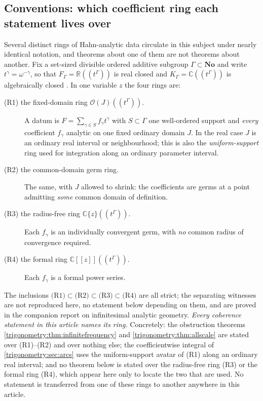 \documentclass[11pt,letterpaper]{article}
\numberwithin{equation}{section}
\theoremstyle{definition}
\theoremstyle{remark}
\newcommand{\No}{\mathbf{No}}
\newcommand{\R}{\mathbb R}
\newcommand{\C}{\mathbb C}
\begin{document}
\subsection{Conventions: which coefficient ring each statement lives over}
\label{trigonometry:sec:rings}
Several distinct rings of Hahn-analytic data circulate in this subject under nearly identical
notation, and theorems about one of them are not theorems about another. Fix a set-sized divisible
ordered additive subgroup $\Gamma\subset\No$ and write $t^\gamma=\omega^{-\gamma}$, so that
$F_\Gamma=\R((t^\Gamma))$ is real closed and $K_\Gamma=\C((t^\Gamma))$ is algebraically closed
\cite{Poonen,vdDE}. In one variable $z$ the four rings are:
\begin{description}
\item[(R1) the fixed-domain ring $\mathcal O(J)((t^\Gamma))$.] A datum is
 $F=\sum_{\gamma\in S}f_\gamma t^\gamma$ with $S\subset\Gamma$ one well-ordered support and
 \emph{every} coefficient $f_\gamma$ analytic on one fixed ordinary domain $J$. In the real case
 $J$ is an ordinary real interval or neighbourhood; this is also the \emph{uniform-support} ring
 used for integration along an ordinary parameter interval.
\item[(R2) the common-domain germ ring.] The same, with $J$ allowed to shrink: the coefficients
 are germs at a point admitting \emph{some} common domain of definition.
\item[(R3) the radius-free ring $\C\{z\}((t^\Gamma))$.] Each $f_\gamma$ is an individually
 convergent germ, with \emph{no} common radius of convergence required.
\item[{(R4) the formal ring $\C[[z]]((t^\Gamma))$.}] Each $f_\gamma$ is a formal power series.
\end{description}
The inclusions $\text{(R1)}\subset\text{(R2)}\subset\text{(R3)}\subset\text{(R4)}$ are all strict; the
separating witnesses are not reproduced here, no statement below depending on them, and are
proved in the companion report on infinitesimal analytic geometry.
\emph{Every coherence statement in this article names its ring.} Concretely: the obstruction
theorems \cref{trigonometry:thm:infinitefrequency} and \cref{trigonometry:thm:allscale} are stated
over (R1)--(R2) and over nothing else; the coefficientwise integral of
\cref{trigonometry:sec:arcs} uses the uniform-support avatar of (R1) along an ordinary real
interval; and no theorem below is stated over the radius-free ring (R3) or the formal ring (R4),
which appear here only to locate the two that are used. No statement is transferred from one of
these rings to another anywhere in this article.
\end{document}
